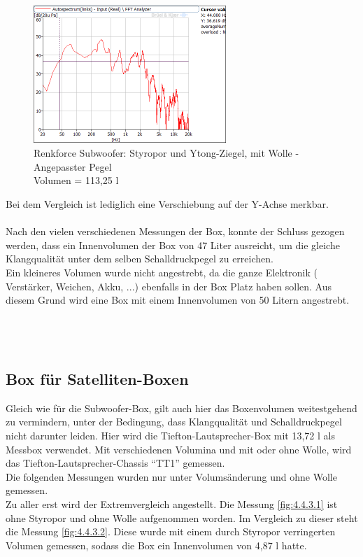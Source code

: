 \begin{figure} [H]
\centering
\includegraphics[width=0.65\textwidth]{img/Optimierung/Sub/RenkforceStyro_113l_Wolle_Angepasst.png}
\caption{Renkforce Subwoofer: Styropor und Ytong-Ziegel, mit Wolle - Angepasster Pegel \\Volumen = 113,25 l}
\label{fig:4.4.2.6}
\end{figure}
Bei dem Vergleich ist lediglich eine Verschiebung auf der Y-Achse merkbar.\\ \\

Nach den vielen verschiedenen Messungen der Box, konnte der Schluss gezogen werden, dass ein Innenvolumen der Box von 47 Liter ausreicht, um die gleiche Klangqualität unter dem selben Schalldruckpegel zu erreichen.\\
Ein kleineres Volumen wurde nicht angestrebt, da die ganze Elektronik ( Verstärker, Weichen, Akku, ...) ebenfalls in der Box Platz haben sollen.
Aus diesem Grund wird eine Box mit einem Innenvolumen von 50 Litern angestrebt.\\ \\ \\ \\




\subsection{Box für Satelliten-Boxen}\label{subsec:4.4.3}
Gleich wie für die Subwoofer-Box, gilt auch hier das Boxenvolumen weitestgehend zu vermindern, unter der Bedingung, dass Klangqualität und Schalldruckpegel nicht darunter leiden.
Hier wird die Tiefton-Lautsprecher-Box mit 13,72 l als Messbox verwendet.
Mit verschiedenen Volumina und mit oder ohne Wolle, wird das Tiefton-Lautsprecher-Chassis \enquote{TT1} gemessen.\\
Die folgenden Messungen wurden nur unter Volumsänderung und ohne Wolle gemessen.\\
Zu aller erst wird der Extremvergleich angestellt.
Die Messung \ref{fig:4.4.3.1} ist ohne Styropor und ohne Wolle aufgenommen worden.
Im Vergleich zu dieser steht die Messung \ref{fig:4.4.3.2}.
Diese wurde mit einem durch Styropor verringerten Volumen gemessen, sodass die Box ein Innenvolumen von 4,87 l hatte.

